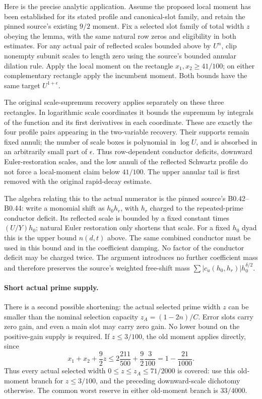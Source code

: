 Here is the precise analytic application. Assume the proposed local
moment has been established for its stated profile and canonical-slot
family, and retain the pinned source's existing $9/2$ moment.
Fix a selected slot family of total width $z$ obeying the lemma,
with the same natural row zeros and eligibility in both estimates.
For any actual pair of reflected scales bounded above by $U^n$, clip
nonempty subunit scales to length zero using the source's bounded
annular dilation rule. Apply the local moment on the rectangle
$x_1,x_2\ge41/100$; on either complementary rectangle apply the
incumbent moment. Both bounds have the same target $U^{1+\epsilon}$.

The original scale-supremum recovery applies separately on these
three rectangles. In logarithmic scale coordinates it bounds the
supremum by integrals of the function and its first derivatives in
each coordinate. These are exactly the four profile pairs appearing
in the two-variable recovery. Their supports remain fixed annuli;
the number of scale boxes is polynomial in $\log U$, and is absorbed
in an arbitrarily small part of $\epsilon$. Thus row-dependent
conductor deficits, downward Euler-restoration scales, and the low
annuli of the reflected Schwartz profile do not force a local-moment
claim below $41/100$. The upper annular tail is first removed with
the original rapid-decay estimate.

The algebra relating this to the actual numerator is the pinned
source's B0.42--B0.44: write a monomial shift as $h_0h_r$, with
$h_r$ charged to the repeated-prime conductor deficit. Its reflected
scale is bounded by a fixed constant times $(U/Y)h_0$; natural Euler
restoration only shortens that scale. For a fixed $h_0$ dyad this
is the upper bound $n(d,t)$ above. The same combined conductor must
be used in this bound and in the coefficient damping. No factor of
the conductor deficit may be charged twice. The argument introduces
no further coefficient mass and therefore preserves the source's
weighted free-shift mass $\sum |c_u(h_0,h_r)|h_0^{\delta/2}$.

\paragraph{Short actual prime supply.}
There is a second possible shortening: the actual selected prime width
$z$ can be smaller than the nominal selection capacity
$z_A=(1-2n)/C$. Error slots carry zero gain, and even a main slot
may carry zero gain. No lower bound on the positive-gain supply is
required. If $z\le3/100$, the old moment applies directly, since
\[
 x_1+x_2+\frac92z
 \le 2\frac{211}{500}+\frac92\frac3{100}
 =1-\frac{21}{1000}.
\]
Thus every actual selected width $0\le z\le z_A\le71/2000$ is
covered: use this old-moment branch for $z\le3/100$, and the
preceding downward-scale dichotomy otherwise. The common worst
reserve in either old-moment branch is $33/4000$.

